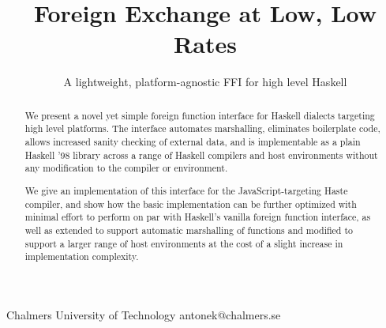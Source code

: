 \documentclass[preprint]{sigplanconf}
\begin{document}
\setlength{\pdfpageheight}{\paperheight}
\setlength{\pdfpagewidth}{\paperwidth}

\exclusivelicense
{} 





\title{Foreign Exchange at Low, Low Rates}
\subtitle{A lightweight, platform-agnostic FFI for high level Haskell}

           {Chalmers University of Technology}
           {antonek@chalmers.se}

\maketitle

\begin{abstract}
  We present a novel yet simple foreign function interface for Haskell dialects
  targeting high level platforms. The interface automates marshalling,
  eliminates boilerplate code, allows increased sanity checking of external
  data, and is implementable as a plain Haskell '98 library across a range of
  Haskell compilers and host environments without any modification to the
  compiler or environment.
  
  We give an implementation of this interface for the JavaScript-targeting
  Haste compiler, and show how the basic implementation can be
  further optimized with minimal effort to perform on par with Haskell's
  vanilla foreign function interface, as well as extended to support automatic
  marshalling of functions and modified to support a larger range of host
  environments at the cost of a slight increase in implementation complexity.
\end{abstract}

\end{document}
